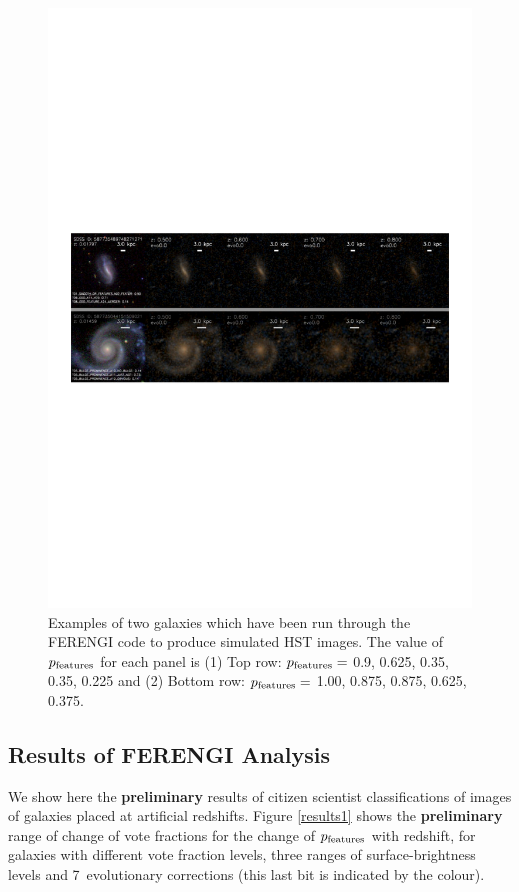 \documentclass[usenatbib]{mn2e}
\begin{document}
\begin{figure}
\includegraphics[width=160mm]{example_ferengi.pdf}
\caption{Examples of two galaxies which have been run through the FERENGI code to produce simulated HST images. The value of $p_{\rm features}$ for each panel is (1) Top row: $p_{\rm features}=$ 0.9, 0.625, 0.35, 0.35, 0.225 and (2) Bottom row: $p_{\rm features}=$ 1.00, 0.875, 0.875, 0.625, 0.375. \label{exampleFERENGI}}
\end{figure}

\subsection{Results of FERENGI Analysis}

We show here the {\bf preliminary} results of citizen scientist classifications of images of galaxies placed at artificial redshifts. Figure \ref{results1} shows the {\bf preliminary} range of change of vote fractions for the change of $p_{\rm features}$ with redshift, for galaxies with different vote fraction levels, three ranges of surface-brightness levels and 7~evolutionary corrections (this last bit is indicated by the colour). 
\end{document}
